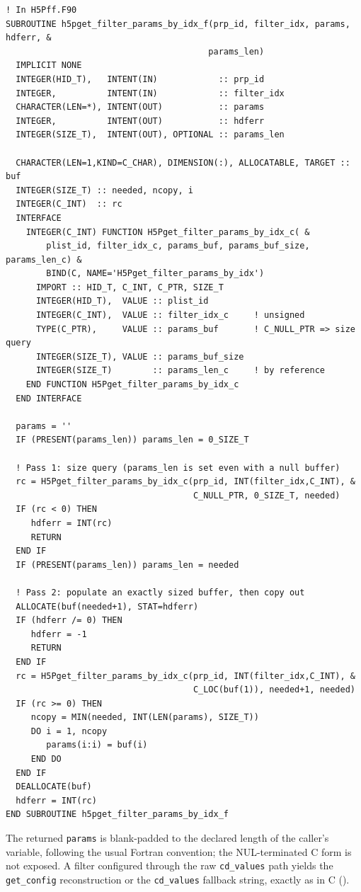 \documentclass[../RFC-HDFG-2026-001.tex]{subfiles}
\begin{document}
\begin{verbatim}
! In H5Pff.F90
SUBROUTINE h5pget_filter_params_by_idx_f(prp_id, filter_idx, params, hdferr, &
                                        params_len)
  IMPLICIT NONE
  INTEGER(HID_T),   INTENT(IN)            :: prp_id
  INTEGER,          INTENT(IN)            :: filter_idx
  CHARACTER(LEN=*), INTENT(OUT)           :: params
  INTEGER,          INTENT(OUT)           :: hdferr
  INTEGER(SIZE_T),  INTENT(OUT), OPTIONAL :: params_len

  CHARACTER(LEN=1,KIND=C_CHAR), DIMENSION(:), ALLOCATABLE, TARGET :: buf
  INTEGER(SIZE_T) :: needed, ncopy, i
  INTEGER(C_INT)  :: rc
  INTERFACE
    INTEGER(C_INT) FUNCTION H5Pget_filter_params_by_idx_c( &
        plist_id, filter_idx_c, params_buf, params_buf_size, params_len_c) &
        BIND(C, NAME='H5Pget_filter_params_by_idx')
      IMPORT :: HID_T, C_INT, C_PTR, SIZE_T
      INTEGER(HID_T),  VALUE :: plist_id
      INTEGER(C_INT),  VALUE :: filter_idx_c     ! unsigned
      TYPE(C_PTR),     VALUE :: params_buf       ! C_NULL_PTR => size query
      INTEGER(SIZE_T), VALUE :: params_buf_size
      INTEGER(SIZE_T)        :: params_len_c     ! by reference
    END FUNCTION H5Pget_filter_params_by_idx_c
  END INTERFACE

  params = ''
  IF (PRESENT(params_len)) params_len = 0_SIZE_T

  ! Pass 1: size query (params_len is set even with a null buffer)
  rc = H5Pget_filter_params_by_idx_c(prp_id, INT(filter_idx,C_INT), &
                                     C_NULL_PTR, 0_SIZE_T, needed)
  IF (rc < 0) THEN
     hdferr = INT(rc)
     RETURN
  END IF
  IF (PRESENT(params_len)) params_len = needed

  ! Pass 2: populate an exactly sized buffer, then copy out
  ALLOCATE(buf(needed+1), STAT=hdferr)
  IF (hdferr /= 0) THEN
     hdferr = -1
     RETURN
  END IF
  rc = H5Pget_filter_params_by_idx_c(prp_id, INT(filter_idx,C_INT), &
                                     C_LOC(buf(1)), needed+1, needed)
  IF (rc >= 0) THEN
     ncopy = MIN(needed, INT(LEN(params), SIZE_T))
     DO i = 1, ncopy
        params(i:i) = buf(i)
     END DO
  END IF
  DEALLOCATE(buf)
  hdferr = INT(rc)
END SUBROUTINE h5pget_filter_params_by_idx_f
\end{verbatim}

\noindent The returned \texttt{params} is blank-padded to the declared length
of the caller's variable, following the usual Fortran convention; the
NUL-terminated C form is not exposed.  A filter configured through the raw
\texttt{cd\_values} path yields the \texttt{get\_config} reconstruction or the
\texttt{cd\_values} fallback string, exactly as in C
().
\end{document}
